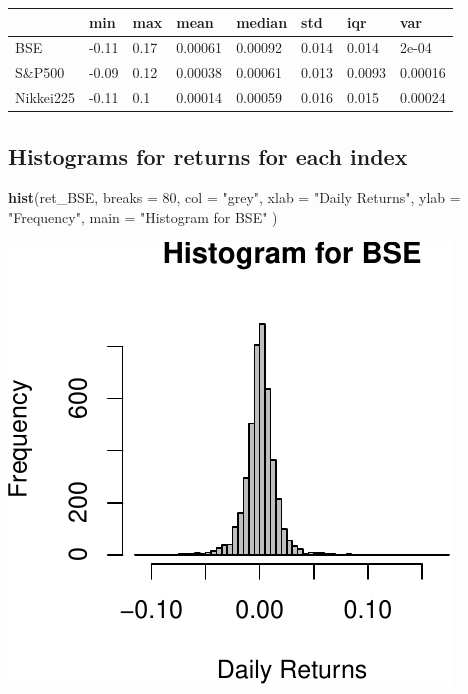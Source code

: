 \documentclass[11pt,]{article}
\newenvironment{Shaded}{\begin{snugshade}}{\end{snugshade}}
\newcommand{\KeywordTok}[1]{\textcolor[rgb]{0.13,0.29,0.53}{\textbf{#1}}}
\newcommand{\DataTypeTok}[1]{\textcolor[rgb]{0.13,0.29,0.53}{#1}}
\newcommand{\DecValTok}[1]{\textcolor[rgb]{0.00,0.00,0.81}{#1}}
\newcommand{\StringTok}[1]{\textcolor[rgb]{0.31,0.60,0.02}{#1}}
\newcommand{\NormalTok}[1]{#1}
\begin{document}
\begin{longtable}[]{@{}llllllll@{}}
\toprule
& min & max & mean & median & std & iqr & var\tabularnewline
\midrule
\endhead
BSE & -0.11 & 0.17 & 0.00061 & 0.00092 & 0.014 & 0.014 &
2e-04\tabularnewline
S\&P500 & -0.09 & 0.12 & 0.00038 & 0.00061 & 0.013 & 0.0093 &
0.00016\tabularnewline
Nikkei225 & -0.11 & 0.1 & 0.00014 & 0.00059 & 0.016 & 0.015 &
0.00024\tabularnewline
\bottomrule
\end{longtable}

\subsection{Histograms for returns for each
index}\label{histograms-for-returns-for-each-index}

\begin{Shaded}
\begin{Highlighting}[]
\KeywordTok{hist}\NormalTok{(ret_BSE,}
     \DataTypeTok{breaks =} \DecValTok{80}\NormalTok{,}
     \DataTypeTok{col =} \StringTok{"grey"}\NormalTok{,}
     \DataTypeTok{xlab =} \StringTok{"Daily Returns"}\NormalTok{,}
     \DataTypeTok{ylab =} \StringTok{"Frequency"}\NormalTok{,}
     \DataTypeTok{main =} \StringTok{"Histogram for BSE"}
\NormalTok{     )}
\end{Highlighting}
\end{Shaded}

\begin{center}\includegraphics{FMC_T4_PhD_Fin_Time_Series_files/figure-latex/histograms-1} \end{center}
\end{document}
